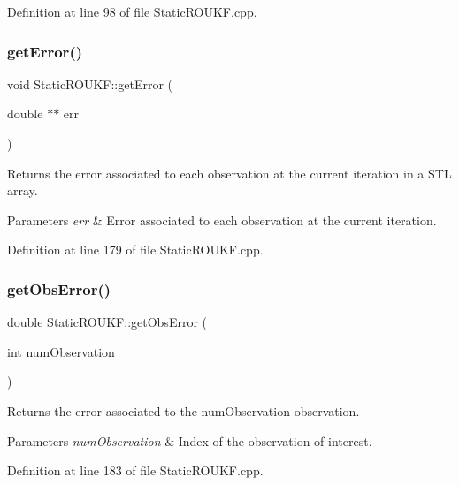 Definition at line 98 of file Static\+R\+O\+U\+K\+F.\+cpp.

\mbox{\label{classStaticROUKF_ae51260a2b2792f27ecf3c441ebe532d4}} 
\subsubsection{\texorpdfstring{get\+Error()}{getError()}}
{\footnotesize\ttfamily void Static\+R\+O\+U\+K\+F\+::get\+Error (\begin{DoxyParamCaption}\item[{double $\ast$$\ast$}]{err }\end{DoxyParamCaption})}

Returns the error associated to each observation at the current iteration in a S\+TL array. 
\begin{DoxyParams}{Parameters}
{\em err} & Error associated to each observation at the current iteration. \\
\hline
\end{DoxyParams}


Definition at line 179 of file Static\+R\+O\+U\+K\+F.\+cpp.

\mbox{\label{classStaticROUKF_acf22483dd4fefba60df6f5e7f29429ec}} 
\subsubsection{\texorpdfstring{get\+Obs\+Error()}{getObsError()}}
{\footnotesize\ttfamily double Static\+R\+O\+U\+K\+F\+::get\+Obs\+Error (\begin{DoxyParamCaption}\item[{int}]{num\+Observation }\end{DoxyParamCaption})}

Returns the error associated to the {\ttfamily num\+Observation} observation. 
\begin{DoxyParams}{Parameters}
{\em num\+Observation} & Index of the observation of interest. \\
\hline
\end{DoxyParams}


Definition at line 183 of file Static\+R\+O\+U\+K\+F.\+cpp.

